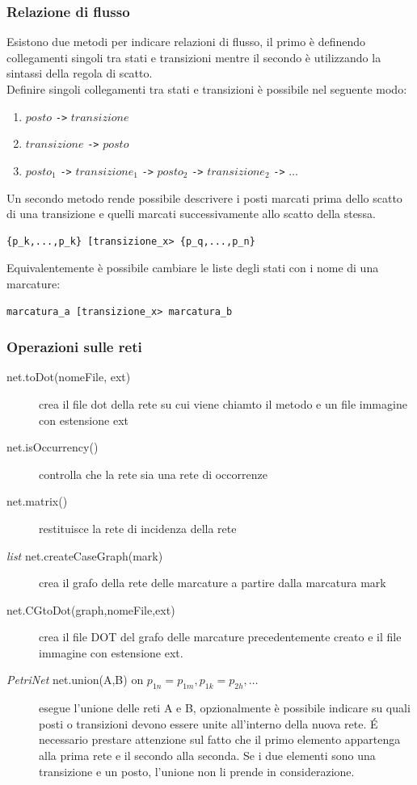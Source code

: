 \documentclass[italian,12pt]{book}
\begin{document}
\subsubsection{Relazione di flusso}
Esistono due metodi per indicare relazioni di flusso, il
primo è definendo collegamenti singoli tra stati e
transizioni mentre il secondo è utilizzando la sintassi
della regola di scatto.\\
Definire singoli collegamenti tra stati e transizioni è
possibile nel seguente modo:
\begin{enumerate}
\item $posto$ \verb"->"  $transizione$
\item $transizione$ \verb"->" $posto$
\item $posto_1$ \verb"->" $transizione_1$ \verb"->" $posto_2$ \verb"->" $
  transizione_2$ \verb"->" $\dots$
\end{enumerate}
Un secondo metodo rende possibile descrivere i posti
marcati prima dello scatto di una transizione e quelli
marcati successivamente allo scatto della stessa.
\begin{verbatim}{p_k,...,p_k} [transizione_x> {p_q,...,p_n}
\end{verbatim}
Equivalentemente è possibile cambiare le liste degli
stati con i nome di una marcature:
\begin{verbatim}marcatura_a [transizione_x> marcatura_b
\end{verbatim}
%
\subsubsection{Operazioni sulle reti}
\begin{description}
\item[net.toDot(nomeFile, ext)] crea il file
  dot della rete su cui viene chiamto il metodo e un
  file immagine con estensione ext
\item[net.isOccurrency()] controlla che la rete sia
  una rete di occorrenze
\item[net.matrix()] restituisce la rete di incidenza
  della rete
\item[\emph{list} net.createCaseGraph(mark)]
  crea il grafo della rete delle marcature a partire
  dalla marcatura mark
\item[net.CGtoDot(graph,nomeFile,ext)] crea il file
  DOT del grafo delle marcature precedentemente creato
  e il file immagine con estensione ext.
\item[\emph{PetriNet} net.union(A,B) on
  $ p_{1n}=p_{1m}, p_{1k}=p_{2h}, \dots $]  esegue l'unione delle reti A e
  B, opzionalmente è possibile indicare su quali posti
  o transizioni devono essere unite all'interno della
  nuova rete. É necessario prestare attenzione sul
  fatto che il primo elemento appartenga alla prima
  rete e il secondo alla seconda. Se i due elementi
  sono una transizione e un posto, l'unione non li
  prende in considerazione.
\end{description}
%       
\end{document}
